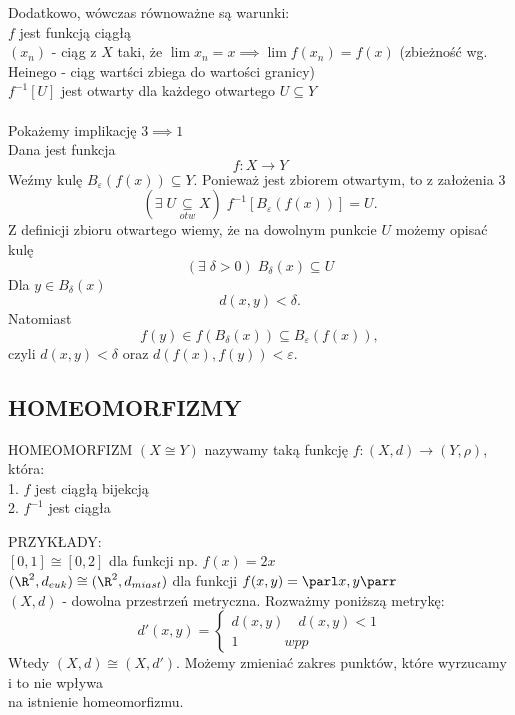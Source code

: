 Dodatkowo, wówczas {równoważne są warunki:}\medskip\\
     $f$ jest funkcją ciągłą\medskip\\
     $(x_n)$ - ciąg z $X$ taki, że $\lim x_n=x\implies \lim f(x_n)=f(x)$ ({\color{emp}zbieżność wg. Heinego} - ciąg wartści zbiega do wartości granicy)\medskip\\
     {\color{emp}$f^{-1}[U]$ jest otwarty} dla każdego otwartego $U\subseteq Y$\bigskip\\
\bigskip\\
\dowod
Pokażemy implikację $3\implies 1$\medskip\\
Dana jest funkcja
$$f:X\to Y$$
Weźmy kulę $B_\varepsilon (f(x))\subseteq Y$. Ponieważ jest zbiorem otwartym, to z założenia 3
$$(\exists\;U\underset{otw}{\subseteq} X)\; f^{-1}[B_\varepsilon(f(x))] =U.$$
Z definicji zbioru otwartego wiemy, że na dowolnym punkcie $U$ możemy opisać kulę
$$(\exists\;\delta>0)\;B_\delta(x)\subseteq U$$
Dla $y\in B_\delta(x)$
$$d(x, y)<\delta.$$
Natomiast 
$$f(y)\in f(B_\delta(x))\subseteq B_\varepsilon(f(x)),$$
czyli $d(x, y) < \delta$ oraz $d(f(x), f(y))<\varepsilon$.
\kondow
\subsection{HOMEOMORFIZMY}
\begin{center}\large
    {\color{def}HOMEOMORFIZM} $(X\cong Y)$ nazywamy taką funkcję $f:(X, d)\to (Y, \rho)$, która:\smallskip\\
    1. $f$ jest ciągłą bijekcją\smallskip\\
    2. $f^{-1}$ jest ciągła
\end{center}\bigskip
{\large\color{emp}PRZYKŁADY:}\medskip\\
$[0, 1]\cong[0,2]$ dla funkcji np. $f(x)=2x$\smallskip\\
$(\R^2, d_{euk})\cong(\R^2, d_{miast})$ dla funkcji $f(x, y)=\parl x,y\parr$\medskip\\
$(X,d)$ - dowolna przestrzeń metryczna. Rozważmy poniższą metrykę:
$$d'(x, y)=\begin{cases}d(x, y)\quad d(x, y) < 1\\1\quad \quad \quad \;wpp\end{cases}$$
Wtedy $(X, d)\cong (X, d')$. Możemy zmieniać zakres punktów, które wyrzucamy i to nie wpływa \\na istnienie homeomorfizmu.

